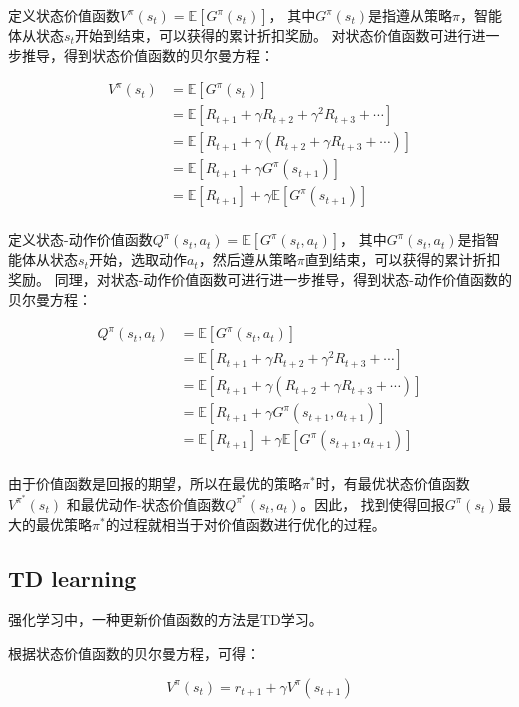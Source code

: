 \documentclass[UTF8]{ctexart}
\begin{document}
定义状态价值函数$V^{\pi}(s_t) = \mathbb{E}[G^{\pi}(s_t)]$，
其中$G^{\pi}(s_t)$是指遵从策略$\pi$，智能体从状态$s_t$开始到结束，可以获得的累计折扣奖励。
对状态价值函数可进行进一步推导，得到状态价值函数的贝尔曼方程：

\begin{align*}
	V^{\pi}(s_t) &= \mathbb{E}[G^{\pi}(s_t)]  \\
	&= \mathbb{E}[R_{t+1} + \gamma R_{t+2} + \gamma^2 R_{t+3} + \cdots]  \\
	&= \mathbb{E}[R_{t+1} + \gamma (R_{t+2} + \gamma R_{t+3} + \cdots)]  \\
	&= \mathbb{E}[R_{t+1} + \gamma G^{\pi}(s_{t+1})] \\
	&= \mathbb{E}[R_{t+1}] + \gamma \mathbb{E}[G^{\pi}(s_{t+1})] \\
\end{align*}


定义状态-动作价值函数$Q^{\pi}(s_t, a_t) = \mathbb{E}[G^{\pi}(s_t, a_t)]$，
其中$G^{\pi}(s_t, a_t)$是指智能体从状态$s_t$开始，选取动作$a_t$，然后遵从策略$\pi$直到结束，可以获得的累计折扣奖励。
同理，对状态-动作价值函数可进行进一步推导，得到状态-动作价值函数的贝尔曼方程：

\begin{align*}
	Q^{\pi}(s_t, a_t) &= \mathbb{E}[G^{\pi}(s_t, a_t)]  \\
	&= \mathbb{E}[R_{t+1} + \gamma R_{t+2} + \gamma^2 R_{t+3} + \cdots]  \\
	&= \mathbb{E}[R_{t+1} + \gamma (R_{t+2} + \gamma R_{t+3} + \cdots)]  \\
	&= \mathbb{E}[R_{t+1} + \gamma G^{\pi}(s_{t+1}, a_{t+1})] \\
	&= \mathbb{E}[R_{t+1}] + \gamma \mathbb{E}[G^{\pi}(s_{t+1}, a_{t+1})] \\
\end{align*}

由于价值函数是回报的期望，所以在最优的策略$\pi^*$时，有最优状态价值函数$V^{\pi^*}(s_t)$
和最优动作-状态价值函数$Q^{\pi^*}(s_t, a_t)$。因此，
找到使得回报$G^{\pi}(s_t)$最大的最优策略$\pi^*$的过程就相当于对价值函数进行优化的过程。

\subsection{TD learning}

强化学习中，一种更新价值函数的方法是TD学习。

根据状态价值函数的贝尔曼方程，可得：

$$V^{\pi}(s_t) = r_{t+1} + \gamma V^{\pi}(s_{t+1})$$
\end{document}
